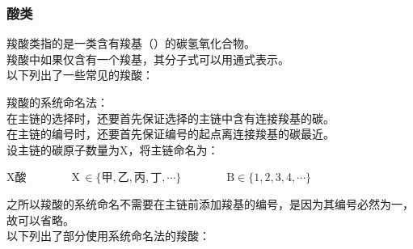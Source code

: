\documentclass[UTF8]{ctexart}
\begin{document}
\subsubsection{酸类}
    羧酸类指的是一类含有羧基（）的碳氢氧化合物。\\[3mm]
    羧酸中如果仅含有一个羧基，其分子式可以用通式表示。\\[3mm]
    以下列出了一些常见的羧酸：\vspace{8pt}
    \begin{center}
        \qquad\quad
        \qquad\quad
    \end{center}\vspace{20pt}
    羧酸的系统命名法：\\[3mm]
    在主链的选择时，还要首先保证选择的主链中含有连接羧基的碳。\\[3mm]
    在主链的编号时，还要首先保证编号的起点离连接羧基的碳最近。\\[3mm]
    设主链的碳原子数量为X，将主链命名为：
    \begin{center}
        X酸~~~~~~~~X\,$\in\big\{\text{甲},\text{乙},\text{丙},\text{丁},\cdots\big\}$~~~~~~~~$\text{B}\in\big\{1,2,3,4,\cdots\big\}$\\[5mm]
    \end{center}
    之所以羧酸的系统命名不需要在主链前添加羧基的编号，是因为其编号必然为一，故可以省略。\\[5mm]
    以下列出了部分使用系统命名法的羧酸：\vspace{8pt}
    \begin{center}
        \qquad\qquad
    \end{center}\vspace{5pt}
\end{document}
